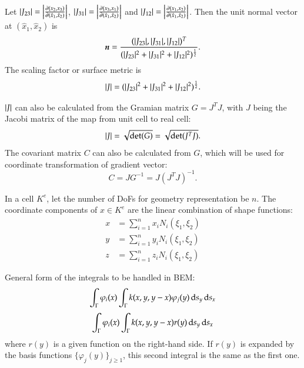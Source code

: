 \documentclass[11pt, a4paper]{article}
\begin{document}
Let $\lvert J_{23}\rvert = \left\vert \frac{\partial (x_2,x_3)}{\partial (\hat{x}_1,\hat{x}_2)}\right\vert$,
$\lvert J_{31}\rvert = \left\vert \frac{\partial (x_3,x_1)}{\partial (\hat{x}_1,\hat{x}_2)}\right\vert$ and
$\lvert J_{12}\rvert = \left\vert \frac{\partial (x_1,x_2)}{\partial (\hat{x}_1,\hat{x}_2)}\right\vert$. Then
the unit normal vector at $(\hat{x}_1,\hat{x}_2)$ is
\begin{equation}
  \label{eq:surface-normal-vector}
  \boldsymbol{n} = \frac{(\lvert J_{23}\rvert,\lvert J_{31}\rvert,\lvert J_{12}\rvert)^T}{(\lvert J_{23}\rvert^2+\lvert J_{31}\rvert^2+\lvert J_{12}\rvert^2)^{\frac{1}{2}}}.
\end{equation}
The scaling factor or surface metric is
\begin{equation}
  \label{eq:surface-metric}
  \lvert J\rvert = (\lvert J_{23}\rvert^2+\lvert J_{31}\rvert^2+\lvert J_{12}\rvert^2)^{\frac{1}{2}}.
\end{equation}

$\lvert J\rvert$ can also be calculated from the Gramian matrix $G = J^TJ$, with $J$ being the
Jacobi matrix of the map from unit cell to real cell:
\begin{equation}
  \label{eq:surface-metric-from-gramian-matrix}
  \lvert J\rvert = \sqrt{\det(G)} = \sqrt{\det(J^TJ)}.
\end{equation}
The covariant matrix $C$ can also be calculated from $G$, which will be used for
coordinate transformation of gradient vector:
\begin{equation}
  \label{eq:covariant-matrix}
  C = J G^{-1} = J(J^TJ)^{-1}.
\end{equation}

In a cell $K^e$, let the number of DoFs for geometry representation be $n$. The coordinate
components of $x\in K^e$ are the linear combination of shape functions:
\begin{equation}
  \begin{split}
    x &= \sum_{i=1}^n x_iN_i(\xi_1,\xi_2) \\
    y &= \sum_{i=1}^n y_iN_i(\xi_1,\xi_2) \\
    z &= \sum_{i=1}^n z_iN_i(\xi_1,\xi_2)
  \end{split}
\end{equation}

General form of the integrals to be handled in BEM:
\begin{equation}
  \int_{\Gamma} \varphi_i(x) \int_{\Gamma}k(x,y,y-x) \varphi_j(y) \,\mathrm{d} s_y \,\mathrm{d} s_x
\end{equation}
\begin{equation}
  \int_{\Gamma}\varphi_i(x)\int_{\Gamma}k(x,y,y-x)r(y) \,\mathrm{d} s_y \,\mathrm{d} s_x
\end{equation}
where $r(y)$ is a given function on the right-hand side. If $r(y)$ is expanded by the basis
functions $\{\varphi_j(y)\}_{j\geq 1}$, this second integral is the same as the first one.
\end{document}
